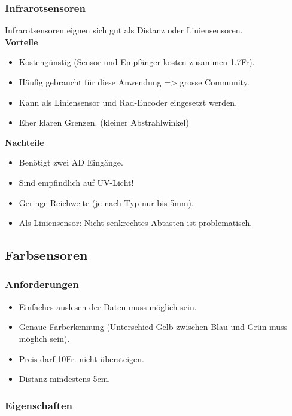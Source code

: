 \subsubsection{Infrarotsensoren}
Infrarotsensoren eignen sich gut als Distanz oder Liniensensoren.\\
\textbf {Vorteile}
\begin{itemize}
\item Kostengünstig (Sensor und Empfänger kosten zusammen 1.7Fr).
\item Häufig gebraucht für diese Anwendung => grosse Community.
\item Kann als Liniensensor und Rad-Encoder eingesetzt werden.
\item Eher klaren Grenzen. (kleiner Abstrahlwinkel)\\
\end{itemize}
\textbf {Nachteile}
\begin{itemize}
\item Benötigt zwei AD Eingänge.
\item Sind empfindlich auf UV-Licht!
\item Geringe Reichweite (je nach Typ nur bis 5mm).
\item Als Liniensensor: Nicht senkrechtes Abtasten ist problematisch.
\end{itemize}

\subsection{Farbsensoren}
\subsubsection{Anforderungen}
\begin{itemize}
\item Einfaches auslesen der Daten muss möglich sein.
\item Genaue Farberkennung (Unterschied Gelb zwischen Blau und Grün muss möglich sein).
\item Preis darf 10Fr. nicht übersteigen.
\item Distanz mindestens 5cm.
\end{itemize}

\subsubsection{Eigenschaften}

